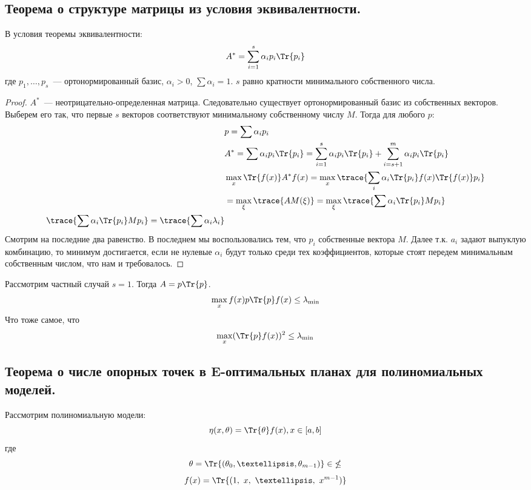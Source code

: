 \subsection{Теорема о структуре матрицы из условия эквивалентности.}
\begin{thm}
В условия теоремы эквивалентности:
$$ A^{*} = \sum \limits_{i=1}^s \alpha_i p_i \Tr{p_i}$$
где $p_1, …, p_s$ —  ортонормированный базис, $\alpha_i >0$, $\sum\alpha_i = 1$. 
$s$ равно кратности минимального собственного числа.
\end{thm}
\begin{proof}
$A^*$ — неотрицательно-определенная матрица. Следовательно существует ортонормированный базис из собственных векторов. Выберем его так, что первые $s$ векторов соответствуют минимальному собственному числу $M$. Тогда для любого $p$:
\begin{equation}
\begin{split}
&p = \sum \alpha_i p_i \\
&A^{*} = \sum \alpha_i p_i \Tr{p_i}  = \sum\limits_{i=1}^{s} \alpha_i p_i \Tr{p_i} + \sum\limits_{i=s+1}^m \alpha_i p_i \Tr{p_i}\\
&\max\limits_x\Tr{f(x)} A^{*} f(x) = \max\limits_{x}\trace{\sum\limits_i  \alpha_i \Tr{p_i} f(x)\Tr{f(x)} p_i} \\
& = \max\limits_{\xi}\trace{A M(\xi)} = \max \limits_{\xi}\trace{\sum \alpha_i \Tr{p_i}Mp_i} \\
\trace{\sum \alpha_i \Tr{p_i}Mp_i} = \trace{\sum \alpha_i \lambda_i}
\end{split}
\end{equation}
Смотрим на последние два равенство. В последнем мы воспользовались тем, что $p_i$ собственные вектора $M$. Далее т.к. $a_i$ задают выпуклую комбинацию, то минимум достигается, если не нулевые $\alpha_i$  будут только среди тех коэффициентов, которые стоят передем минимальным собственным числом, что нам и требовалось.
\end{proof}

\begin{note}
Рассмотрим частный случай $s=1$. Тогда $A = p \Tr{p}$. 
$$\max\limits_{x} f(x) p \Tr{p} f(x) \leq \lambda_{\min}$$
Что тоже самое, что 
$$\max\limits_{x} (\Tr{p}f(x))^2 \leq \lambda_{\min}$$
\end{note}

\subsection{Теорема о числе опорных точек в E-оптимальных планах для полиномиальных моделей.}
Рассмотрим полиномиальную модели:
\begin{equation}
\eta(x,\theta)  = \Tr{\theta}f(x), x \in [a,b]
\end{equation}
где
$$\theta = \Tr{(\theta_0, …, \theta_{m-1})}  \in \mathbb{\Theta}$$
$$f(x) = \Tr{(1, x, …, x^{m-1})}$$

